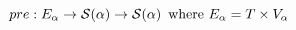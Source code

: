 \documentclass[preview]{standalone}
\begin{document}
\begin{equation*}
  \mathbin{pre} : E_\alpha \rightarrow \mathcal{S}(\alpha) \rightarrow \mathcal{S}(\alpha) \,
  \text{ where } E_\alpha = T \times V_\alpha
\end{equation*}
\end{document}
